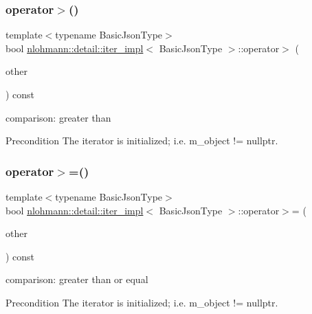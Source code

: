 \subsubsection{\texorpdfstring{operator$>$()}{operator>()}}
{\footnotesize\ttfamily template$<$typename Basic\+Json\+Type$>$ \\
bool \hyperlink{classnlohmann_1_1detail_1_1iter__impl}{nlohmann\+::detail\+::iter\+\_\+impl}$<$ Basic\+Json\+Type $>$\+::operator$>$ (\begin{DoxyParamCaption}\item[{const \hyperlink{classnlohmann_1_1detail_1_1iter__impl}{iter\+\_\+impl}$<$ Basic\+Json\+Type $>$ \&}]{other }\end{DoxyParamCaption}) const\hspace{0.3cm}{\ttfamily [inline]}}



comparison\+: greater than 

\begin{DoxyPrecond}{Precondition}
The iterator is initialized; i.\+e. {\ttfamily m\+\_\+object != nullptr}. 
\end{DoxyPrecond}
\mbox{\label{classnlohmann_1_1detail_1_1iter__impl_a634f85da575cb60b012a687efa26e11a}} 
\subsubsection{\texorpdfstring{operator$>$=()}{operator>=()}}
{\footnotesize\ttfamily template$<$typename Basic\+Json\+Type$>$ \\
bool \hyperlink{classnlohmann_1_1detail_1_1iter__impl}{nlohmann\+::detail\+::iter\+\_\+impl}$<$ Basic\+Json\+Type $>$\+::operator$>$= (\begin{DoxyParamCaption}\item[{const \hyperlink{classnlohmann_1_1detail_1_1iter__impl}{iter\+\_\+impl}$<$ Basic\+Json\+Type $>$ \&}]{other }\end{DoxyParamCaption}) const\hspace{0.3cm}{\ttfamily [inline]}}



comparison\+: greater than or equal 

\begin{DoxyPrecond}{Precondition}
The iterator is initialized; i.\+e. {\ttfamily m\+\_\+object != nullptr}. 
\end{DoxyPrecond}
\mbox{\label{classnlohmann_1_1detail_1_1iter__impl_ac0b9276f1102ed4b9cd3f5f56287e3ce}} 
